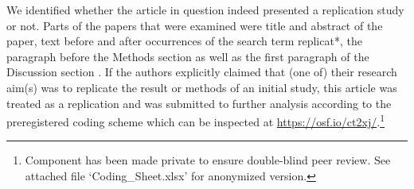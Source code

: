 \documentclass[cm,linguex]{glossa}
\begin{document}
We identified whether the article in question indeed presented a replication study or not.
Parts of the papers that were examined were title and abstract of the paper, text before and after occurrences of the search term replicat*, the paragraph before the Methods section as well as the first paragraph of the Discussion section \citep[following and adapting the procedure specified by][]{makel_replication_2016}.
If the authors explicitly claimed that (one of) their research aim(s) was to replicate the result or methods of an initial study, this article was treated as a replication and was submitted to further analysis according to the preregistered coding scheme which can be inspected at \url{https://osf.io/ct2xj/}.\footnote{Component has been made private to ensure double-blind peer review. See attached file `Coding\_Sheet.xlsx' for anonymized version.}
\end{document}
